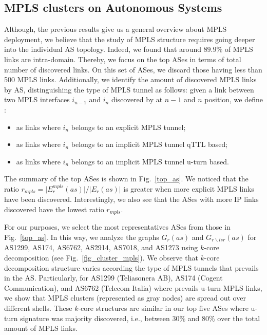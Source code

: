 \subsection{MPLS clusters on Autonomous Systems}\label{cluster.as}
Although, the previous results give us a general overview about MPLS deployment,
we believe that the study of MPLS structure requires going deeper into the
individual AS topology. Indeed, we found that around $89.9\%$ of MPLS links are
intra-domain. Thereby, we focus on the top ASes in terms of total number of
discovered links.  On this set of ASes, we discard those having less than 500
MPLS links. Additionally, we identify the amount of discovered MPLS links by AS,
distinguishing the type of MPLS tunnel as follows: given a link between two MPLS
interfaces $i_{n-1}$  and $i_{n}$ discovered by \traceroute at $n-1$ and $n$
position, we define : 
\begin{itemize}
  \item {} as links  where $i_{n}$ belongs to an explicit
  MPLS tunnel;
  \item {} as links  where $i_{n}$ belongs  to an implicit
  MPLS tunnel qTTL based;
  \item {} as links where $i_{n}$ belongs to an
  implicit MPLS tunnel u-turn based.
\end{itemize}

The summary of the top ASes  is shown in
Fig.~\ref{top_as}. We noticed that the ratio $r_{mpls}= \vert E^{mpls}_{r} (as)
\vert /\vert E_{r} (as) \vert $ is greater when more explicit MPLS links have
been discovered. Interestingly, we also see that the ASes with more IP links
discovered have the lowest ratio $r_{mpls}$. 

For our purposes, we select the most representatives ASes from those in
Fig.~\ref{top_as}. In this way, we analyze the graphs $G_{r}(as)$ and
$G_{r\backslash lsr}(as)$ for AS1299, AS174, AS6762, AS2914, AS7018, and AS1273
using $k$-core decomposition (see Fig.~\ref{fig_cluster_mpls}). We observe that
$k$-core decomposition structure varies according the type of MPLS tunnels that
prevails in the AS. Particularly, for  AS1299 (Teliasonera AB), AS174 (Cogent
Communication), and AS6762 (Telecom Italia) where prevails u-turn MPLS links, we
show that MPLS clusters (represented as gray nodes) are spread out over
different shells. These $k$-core structures are similar in our top five ASes
where u-turn signature was majority discovered, i.e., between $30\%$ and $80\%$
over the total amount of MPLS links.


